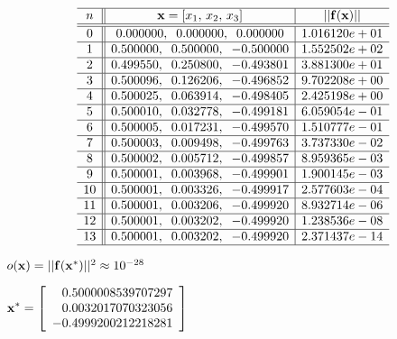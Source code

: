 \documentclass{article}
\def\lthtmlcheckvsize{\ifdim\ht\sizebox<\vsize 
  \ifdim\wd\sizebox<\hsize\expandafter\hfill\fi \expandafter\vfill
  \else\expandafter\vss\fi}%
\begin{document}
{\newpage\clearpage
{}%
\begin{displaymath}\begin{array}{c||c|c}\hline
n & {\bf x}=[x_1,\,x_2,\,x_3]  & ||{\bf f}({\bf x})|| \\\hline\hline
0 &	0.000000,\;\; 0.000000,\;\;  0.000000 &	1.016120e+01  \\\hline
1 &	0.500000,\;\; 0.500000,\;\; -0.500000 &	1.552502e+02  \\\hline
2 &	0.499550,\;\; 0.250800,\;\; -0.493801 &	3.881300e+01  \\\hline
3 &	0.500096,\;\; 0.126206,\;\; -0.496852 &	9.702208e+00  \\\hline
4 &	0.500025,\;\; 0.063914,\;\; -0.498405 &	2.425198e+00  \\\hline
5 &	0.500010,\;\; 0.032778,\;\; -0.499181 &	6.059054e-01  \\\hline
6 &	0.500005,\;\; 0.017231,\;\; -0.499570 &	1.510777e-01  \\\hline
7 &	0.500003,\;\; 0.009498,\;\; -0.499763 &	3.737330e-02  \\\hline
8 &	0.500002,\;\; 0.005712,\;\; -0.499857 &	8.959365e-03  \\\hline
9 &	0.500001,\;\; 0.003968,\;\; -0.499901 &	1.900145e-03  \\\hline
10 &	0.500001,\;\; 0.003326,\;\; -0.499917 &	2.577603e-04  \\\hline
11 &	0.500001,\;\; 0.003206,\;\; -0.499920 &	8.932714e-06  \\\hline
12 &	0.500001,\;\; 0.003202,\;\; -0.499920 &	1.238536e-08  \\\hline
13 &	0.500001,\;\; 0.003202,\;\; -0.499920 &	2.371437e-14  \\\hline
\end{array}\end{displaymath}%
\lthtmldisplayZ
\lthtmlcheckvsize\clearpage}

{\newpage\clearpage
{}%
$ o({\bf x})=||{\bf f}({\bf x}^*)||^2\approx 10^{-28}$%
\lthtmlindisplaymathZ
\lthtmlcheckvsize\clearpage}

{\newpage\clearpage
{}%
$\displaystyle {\bf x}^*=\left[\begin{array}{r}0.5000008539707297\\0.0032017070323056\\
-0.4999200212218281\end{array}\right]$%
\lthtmlindisplaymathZ
\lthtmlcheckvsize\clearpage}
\end{document}
